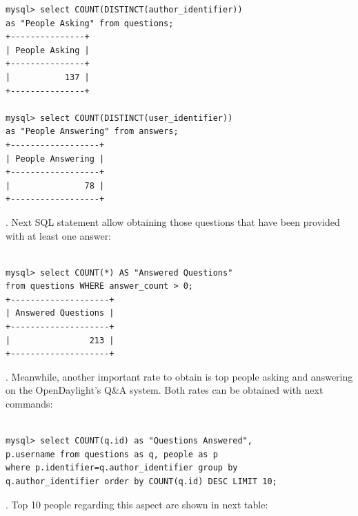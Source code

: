 \documentclass[a4paper, 12pt]{book}
\begin{document}
{\begin{verbatim}
mysql> select COUNT(DISTINCT(author_identifier))
as "People Asking" from questions;
+---------------+
| People Asking |
+---------------+
|           137 |
+---------------+

mysql> select COUNT(DISTINCT(user_identifier))
as "People Answering" from answers;
+------------------+
| People Answering |
+------------------+
|               78 |
+------------------+

\end{verbatim}

. Next SQL statement allow obtaining those questions that have been provided with at least one answer:

\begin{verbatim}

mysql> select COUNT(*) AS "Answered Questions"
from questions WHERE answer_count > 0;
+--------------------+
| Answered Questions |
+--------------------+
|                213 |
+--------------------+

\end{verbatim}

. Meanwhile, another important rate to obtain is top people asking and answering on the OpenDaylight's Q\&A system. Both rates can be obtained with next commands:

\begin{verbatim}

mysql> select COUNT(q.id) as "Questions Answered",
p.username from questions as q, people as p
where p.identifier=q.author_identifier group by
q.author_identifier order by COUNT(q.id) DESC LIMIT 10;

\end{verbatim}
. Top 10 people regarding this aspect are shown in next table:

}
\end{document}

